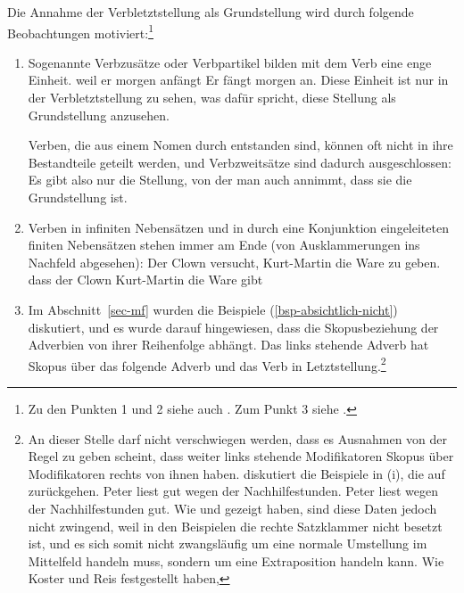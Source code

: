 Die Annahme der Verbletztstellung\label{page-verbletzt} als Grundstellung wird durch folgende Beobachtungen
motiviert:\footnote{
  Zu den Punkten 1 und 2 siehe auch . Zum Punkt
  3 siehe .%
}
\begin{enumerate}
\item Sogenannte Verbzusätze oder Verbpartikel bilden mit dem Verb eine enge Einheit.
\eal
\ex weil er morgen anfängt
\ex Er fängt morgen an.
\zl
Diese Einheit ist nur in der Verbletztstellung zu sehen, was dafür spricht, diese
Stellung als Grundstellung anzusehen. 

Verben, die aus einem Nomen durch  entstanden sind, können oft nicht
in ihre Bestandteile geteilt werden, und Verbzweitsätze sind dadurch ausgeschlossen:
\eal
{}
\zl
{}
Es gibt also nur die Stellung, von der man auch annimmt, dass sie die Grundstellung ist.
\item Verben in infiniten Nebensätzen und in durch eine Konjunktion eingeleiteten
finiten Nebensätzen stehen immer am Ende (von Ausklammerungen ins Nachfeld abgesehen):
\eal
\ex Der Clown versucht, Kurt-Martin die Ware zu geben.
\ex dass der Clown Kurt-Martin die Ware gibt
\zl
\item{} Im Abschnitt~\ref{sec-mf} wurden die Beispiele (\ref{bsp-absichtlich-nicht}) diskutiert,
und es wurde darauf hingewiesen, dass die Skopusbeziehung der Adverbien
von ihrer Reihenfolge abhängt. Das links stehende Adverb hat Skopus über das folgende Adverb
und das Verb in Letztstellung.\footnote{%
An dieser Stelle darf nicht verschwiegen werden,
  dass es Ausnahmen von der Regel zu geben scheint, dass weiter links stehende Modifikatoren
  Skopus über Modifikatoren rechts von ihnen haben. \citet*[]{Kasper94a}
  diskutiert die Beispiele in (i), die auf  \citet*[]{BV72} zurückgehen.
\eal
\label{bsp-peter-liest-gut-wegen}
\ex Peter liest gut wegen der Nachhilfestunden.
\ex Peter liest wegen der Nachhilfestunden gut.
\zl
  Wie \citet[Abschnitt~6]{Koster75a} und \citet*[]{Reis80a} gezeigt haben, sind diese Daten jedoch nicht
  zwingend, weil in den Beispielen die rechte Satzklammer nicht besetzt ist, und es sich
  somit nicht zwangsläufig um eine normale Umstellung im Mittelfeld handeln muss, sondern um 
  eine Extraposition handeln kann. Wie Koster und Reis festgestellt haben,
}
\end{enumerate}

